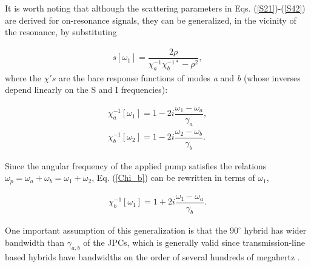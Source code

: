 \documentclass[aip,onecolumn,10pt]{revtex4}%
\begin{document}
It is worth noting that although the scattering parameters in Eqs. (\ref{S21})-(\ref{S42}) are derived for on-resonance signals, they can be generalized, in the vicinity of the resonance, by substituting 

\begin{align}
s[\omega_1]=\dfrac{2\rho}{\chi_{a}^{-1}\chi_{b}^{-1*}-\rho^2}, \label{s_param_vs_freq} 
\end{align}
where the $\chi's$ are the bare response functions of modes \textit{a} and \textit{b} (whose inverses depend linearly on the S and I frequencies): 

\begin{align}
\chi_{a}^{-1}[\omega_{1}]=1-2i\dfrac{\omega_{1}-\omega_{a}}{\gamma_{a}}, \label{Chi_a} \\ 
\chi_{b}^{-1}[\omega_{2}]=1-2i\dfrac{\omega_{2}-\omega_{b}}{\gamma_{b}}. 
\label{Chi_b}%
\end{align}

Since the angular frequency of the applied pump satisfies the relations $\omega_{p}=\omega_{a}+\omega_{b}=\omega_{1}+\omega_{2}$, Eq. (\ref{Chi_b}) can be rewritten in terms of $\omega_{1}$, 

\begin{align}
\chi_{b}^{-1}[\omega_{1}]=1+2i\dfrac{\omega_{1}-\omega_{a}}{\gamma_{b}}.
\label{Chi_b_mod}%
\end{align}

One important assumption of this generalization is that the $90^{\circ}$ hybrid has wider bandwidth than $\gamma_{a,b}$ of the JPCs, which is generally valid since transmission-line based hybrids have bandwidths on the order of several hundreds of megahertz \cite{CPWhybrids}. 
\end{document}

